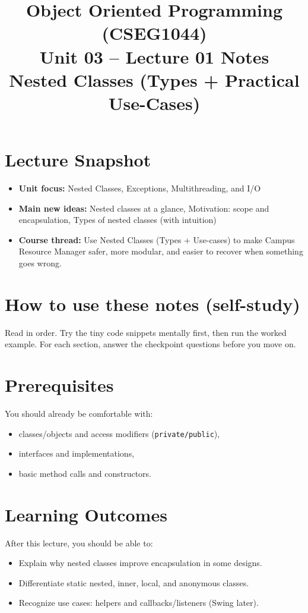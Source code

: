 \documentclass[11pt]{article}
\title{Object Oriented Programming (CSEG1044)\\Unit 03 -- Lecture 01 Notes\\Nested Classes (Types + Practical Use-Cases)}
\begin{document}
\maketitle
\tableofcontents

\section{Lecture Snapshot}
\begin{itemize}
  \item \textbf{Unit focus:} Nested Classes, Exceptions, Multithreading, and I/O
  \item \textbf{Main new ideas:} Nested classes at a glance, Motivation: scope and encapsulation, Types of nested classes (with intuition)
  \item \textbf{Course thread:} Use Nested Classes (Types + Use-cases) to make Campus Resource Manager safer, more modular, and easier to recover when something goes wrong.
\end{itemize}
\notesources{\OOPSUnitIIISources}

\section{How to use these notes (self-study)}
Read in order. Try the tiny code snippets mentally first, then run the worked example.
For each section, answer the checkpoint questions before you move on.

\section{Prerequisites}
You should already be comfortable with:
\begin{itemize}
  \item classes/objects and access modifiers (\texttt{private/public}),
  \item interfaces and implementations,
  \item basic method calls and constructors.
\end{itemize}

\section{Learning Outcomes}
After this lecture, you should be able to:
\begin{itemize}
  \item Explain why nested classes improve encapsulation in some designs.
  \item Differentiate static nested, inner, local, and anonymous classes.
  \item Recognize use cases: helpers and callbacks/listeners (Swing later).
\end{itemize}
\end{document}
